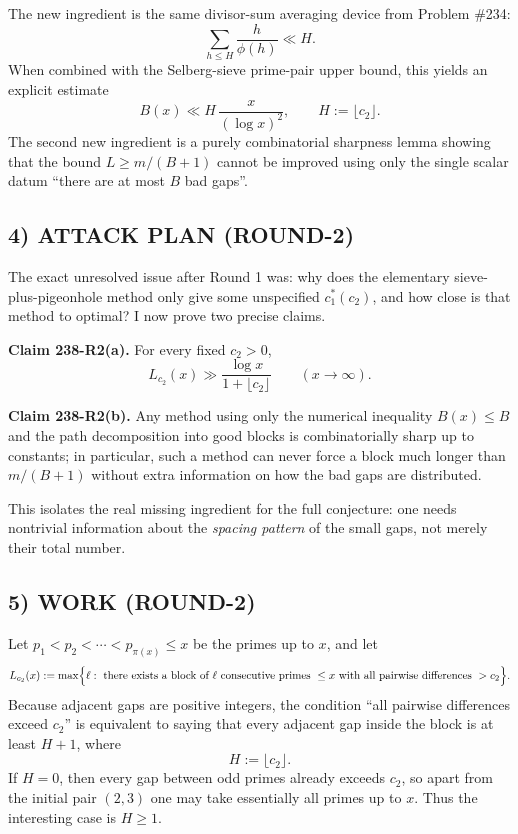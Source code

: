 The new ingredient is the same divisor-sum averaging device from Problem \#234:
\[
\sum_{h\le H}\frac{h}{\phi(h)}\ll H.
\]
When combined with the Selberg-sieve prime-pair upper bound, this yields an explicit estimate
\[
B(x)\ll H\,\frac{x}{(\log x)^2},
\qquad H:=\lfloor c_2\rfloor.
\]
The second new ingredient is a purely combinatorial sharpness lemma showing that the bound $L\ge m/(B+1)$ cannot be improved using only the single scalar datum ``there are at most $B$ bad gaps''.

\subsection*{4) ATTACK PLAN (ROUND-2)}

The exact unresolved issue after Round 1 was: why does the elementary sieve-plus-pigeonhole method only give some unspecified $c_1^*(c_2)$, and how close is that method to optimal? I now prove two precise claims.

\medskip
\noindent
\textbf{Claim 238-R2(a).}
For every fixed $c_2>0$,
\[
L_{c_2}(x)\gg \frac{\log x}{1+\lfloor c_2\rfloor}
\qquad (x\to\infty).
\]

\noindent
\textbf{Claim 238-R2(b).}
Any method using only the numerical inequality $B(x)\le B$ and the path decomposition into good blocks is combinatorially sharp up to constants; in particular, such a method can never force a block much longer than $m/(B+1)$ without extra information on how the bad gaps are distributed.
\medskip

This isolates the real missing ingredient for the full conjecture: one needs nontrivial information about the \emph{spacing pattern} of the small gaps, not merely their total number.

\subsection*{5) WORK (ROUND-2)}

Let $p_1<p_2<\cdots<p_{\pi(x)}\le x$ be the primes up to $x$, and let
\[
L_{c_2}(x):=\max\Bigl\{\ell:\ \text{there exists a block of }\ell\text{ consecutive primes }\le x\text{ with all pairwise differences }>c_2\Bigr\}.
\]
Because adjacent gaps are positive integers, the condition ``all pairwise differences exceed $c_2$'' is equivalent to saying that every adjacent gap inside the block is at least $H+1$, where
\[
H:=\lfloor c_2\rfloor.
\]
If $H=0$, then every gap between odd primes already exceeds $c_2$, so apart from the initial pair $(2,3)$ one may take essentially all primes up to $x$. Thus the interesting case is $H\ge 1$.

